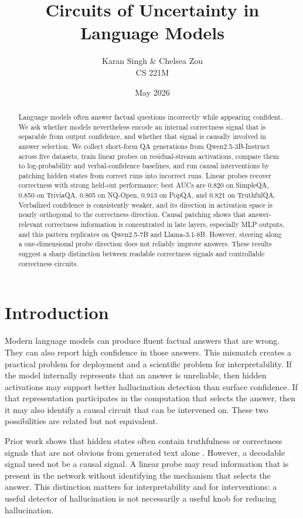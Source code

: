 \documentclass[11pt]{article}
\title{Circuits of Uncertainty in Language Models}
\author{Karan Singh \& Chelsea Zou \\ CS 221M}
\date{May 2026}
\newcommand{\qwen}{Qwen2.5-3B-Instruct}
\begin{document}
\maketitle

\begin{abstract}
Language models often answer factual questions incorrectly while appearing
confident. We ask whether models nevertheless encode an internal correctness
signal that is separable from output confidence, and whether that signal is
causally involved in answer selection. We collect short-form QA generations from
\qwen{} across five datasets, train linear probes on residual-stream activations,
compare them to log-probability and verbal-confidence baselines, and run causal
interventions by patching hidden states from correct runs into incorrect runs.
Linear probes recover correctness with strong held-out performance: best AUCs are
0.820 on SimpleQA, 0.850 on TriviaQA, 0.805 on NQ-Open, 0.913 on PopQA, and 0.821
on TruthfulQA. Verbalized confidence is consistently weaker, and its direction in
activation space is nearly orthogonal to the correctness direction. Causal
patching shows that answer-relevant correctness information is concentrated in
late layers, especially MLP outputs, and this pattern replicates on Qwen2.5-7B and
Llama-3.1-8B. However, steering along a one-dimensional probe direction does not
reliably improve answers. These results suggest a sharp distinction between
readable correctness signals and controllable correctness circuits.
\end{abstract}

\section{Introduction}

Modern language models can produce fluent factual answers that are wrong. They can
also report high confidence in those answers. This mismatch creates a practical
problem for deployment and a scientific problem for interpretability. If the model
internally represents that an answer is unreliable, then hidden activations may
support better hallucination detection than surface confidence. If that
representation participates in the computation that selects the answer, then it
may also identify a causal circuit that can be intervened on. These two
possibilities are related but not equivalent.

Prior work shows that hidden states often contain truthfulness or correctness
signals that are not obvious from generated text alone
\citep{Azaria2023TheLying,Burns2024DiscoveringSupervision,Marks2024TheDatasets}.
However, a decodable signal need not be a causal signal. A linear probe may read
information that is present in the network without identifying the mechanism that
selects the answer. This distinction matters for interpretability and for
interventions: a useful detector of hallucination is not necessarily a useful knob
for reducing hallucination.
\end{document}
